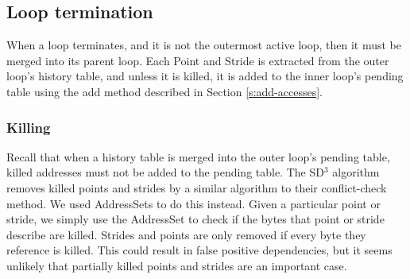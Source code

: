 \documentclass[12pt,twoside]{reedthesis}
\begin{document}
			
		\subsection{Loop termination}
		
			When a loop terminates, and it is not the outermost active loop, then it must be merged into its parent loop. Each Point and Stride is extracted from the outer loop's history table, and unless it is killed, it is added to the inner loop's pending table using the add method described in Section \ref{s:add-accesses}. 
		
		\subsubsection{Killing}
		
			Recall that when a history table is merged into the outer loop's pending table, killed addresses must not be added to the pending table. 
			The SD$^3$ algorithm removes killed points and strides by a similar algorithm to their conflict-check method. We used AddressSets to do this instead. Given a particular point or stride, we simply use the AddressSet to check if the bytes that point or stride describe are killed. Strides and points are only removed if every byte they reference is killed. This could result in false positive dependencies, but it seems unlikely that partially killed points and strides are an important case. 
%			
%			
		
			
			
			
			
\end{document}
